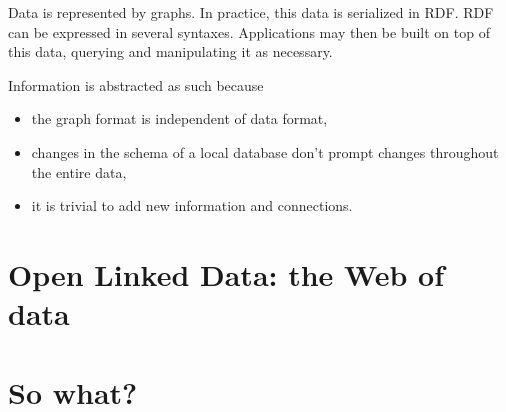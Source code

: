 \documentclass{report}
\begin{document}
Data is represented by graphs.
In practice, this data is serialized in RDF.
RDF can be expressed in several syntaxes.
Applications may then be built on top of this data,
querying and manipulating it as necessary.

Information is abstracted as such because
\begin{itemize}
  \item the graph format is independent of data format,
  \item changes in the schema of a local database
        don't prompt changes throughout the entire data,
  \item it is trivial to add new information and connections.
\end{itemize}

\section{Open Linked Data: the Web of data}

\section{So what?}
\end{document}
